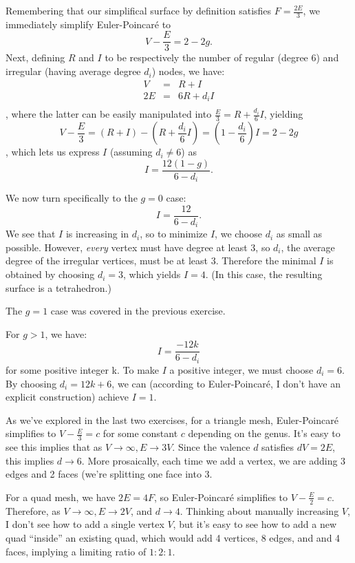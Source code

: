 \documentclass[11pt]{article}
\newenvironment{exercise}[2][Exercise]{\begin{trivlist}
\item[\hskip \labelsep {\bfseries #1}\hskip \labelsep {\bfseries #2}]}{\end{trivlist}}
\begin{document}
\begin{exercise}{2.4, Minimum Irregular Valence.}
  Remembering that our simplifical surface by definition satisfies $F = \frac{2E}{3}$, we immediately simplify Euler-Poincar\'{e} to
  $$V - \frac{E}{3} = 2 - 2g.$$
  Next, defining $R$ and $I$ to be respectively the number of regular (degree 6) and irregular (having average degree $d_i$) nodes, we have:
  \begin{eqnarray*}
    V & = & R + I \\
    2E & = & 6R + d_iI \\
  \end{eqnarray*},
  where the latter can be easily manipulated into $\frac{E}{3} = R + \frac{d_i}{6} I$, yielding
  $$V - \frac{E}{3} = (R + I) - (R + \frac{d_i}{6} I) = (1 - \frac{d_i}{6})I = 2 - 2g$$,
  which lets us express $I$ (assuming $d_i \neq 6$) as
  $$I = \frac{12(1-g)}{6-d_i}.$$

  We now turn specifically to the $g=0$ case:
  $$I = \frac{12}{6 - d_i}.$$
  We see that $I$ is increasing in $d_i$, so to minimize $I$, we choose $d_i$ as small as possible. However, {\em every} vertex must have degree at least 3, so $d_i$, the average degree of the irregular vertices, must be at least 3. Therefore the minimal $I$ is obtained by choosing $d_i = 3$, which yields $I=4.$ (In this case, the resulting surface is a tetrahedron.)

  The $g=1$ case was covered in the previous exercise.

  For $g > 1$, we have:
  $$I = \frac{-12k}{6-d_i}$$
  for some positive integer k. To make $I$ a positive integer, we must choose $d_i = 6$. By choosing $d_i = 12k + 6$, we can (according to Euler-Poincar\'{e}, I don't have an explicit construction) achieve $I = 1$.
\end{exercise}

\begin{exercise}{2.5, Mean Valence (Triangle Mesh).}
  As we've explored in the last two exercises, for a triangle mesh, Euler-Poincar\'{e} simplifies to $V - \frac{E}{3} = c$ for some constant $c$ depending on the genus. It's easy to see this implies that as $V \rightarrow \infty, E \rightarrow 3V$. Since the valence $d$ satisfies $d V = 2E$, this implies $d \rightarrow 6$. More prosaically, each time we add a vertex, we are adding 3 edges and 2 faces (we're splitting one face into 3.
\end{exercise}

\begin{exercise}{2.6, Mean Valence (Quad Mesh).}
  For a quad mesh, we have $2E = 4F$, so Euler-Poincar\'{e} simplifies to $V - \frac{E}{2} = c$. Therefore, as $V \rightarrow \infty, E \rightarrow 2V$, and $d \rightarrow 4$. Thinking about manually increasing $V$, I don't see how to add a single vertex $V$, but it's easy to see how to add a new quad ``inside'' an existing quad, which would add 4 vertices, 8 edges, and and 4 faces, implying a limiting ratio of $1:2:1$.
\end{exercise}
\end{document}
